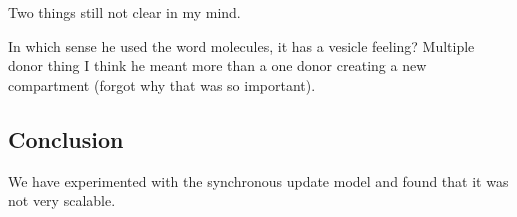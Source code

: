 \documentclass[preprint,12pt]{elsarticle}
\begin{document}



 


 


Two things still not clear in my mind.

In which sense he used the word molecules, it has a vesicle feeling? 
Multiple donor thing {I think he meant { more than a one donor creating a new compartment} } (forgot why that was so important). 

\subsection{Conclusion}
We have experimented with the synchronous update model and found that it was not very scalable.


\nolinenumbers
\end{document}
